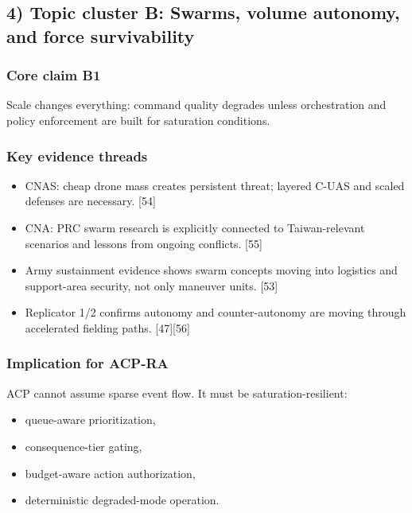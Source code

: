 \documentclass[
]{article}
\providecommand{\tightlist}{%
  \setlength{\itemsep}{0pt}\setlength{\parskip}{0pt}}
\begin{document}
\hypertarget{topic-cluster-b-swarms-volume-autonomy-and-force-survivability}{%
\subsection{4) Topic cluster B: Swarms, volume autonomy, and force
survivability}\label{topic-cluster-b-swarms-volume-autonomy-and-force-survivability}}

\hypertarget{core-claim-b1}{%
\subsubsection{Core claim B1}\label{core-claim-b1}}

Scale changes everything: command quality degrades unless orchestration
and policy enforcement are built for saturation conditions.

\hypertarget{key-evidence-threads-1}{%
\subsubsection{Key evidence threads}\label{key-evidence-threads-1}}

\begin{itemize}
\tightlist
\item
  CNAS: cheap drone mass creates persistent threat; layered C-UAS and
  scaled defenses are necessary. {[}54{]}
\item
  CNA: PRC swarm research is explicitly connected to Taiwan-relevant
  scenarios and lessons from ongoing conflicts. {[}55{]}
\item
  Army sustainment evidence shows swarm concepts moving into logistics
  and support-area security, not only maneuver units. {[}53{]}
\item
  Replicator 1/2 confirms autonomy and counter-autonomy are moving
  through accelerated fielding paths. {[}47{]}{[}56{]}
\end{itemize}

\hypertarget{implication-for-acp-ra-1}{%
\subsubsection{Implication for ACP-RA}\label{implication-for-acp-ra-1}}

ACP cannot assume sparse event flow. It must be saturation-resilient:

\begin{itemize}
\tightlist
\item
  queue-aware prioritization,
\item
  consequence-tier gating,
\item
  budget-aware action authorization,
\item
  deterministic degraded-mode operation.
\end{itemize}
\end{document}
